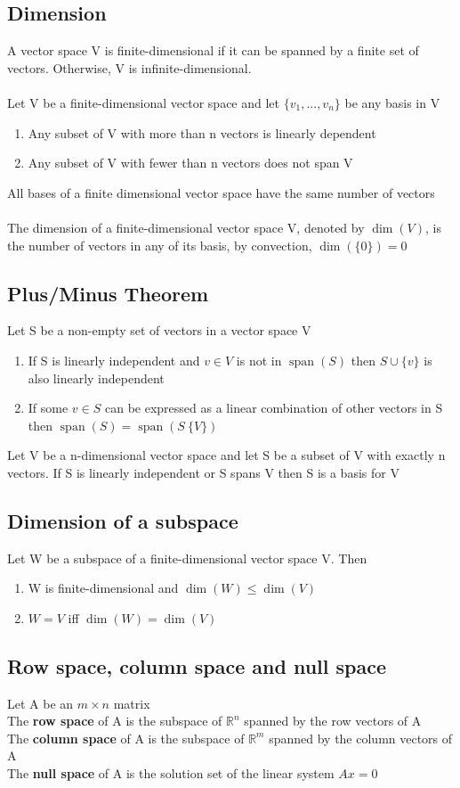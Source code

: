 \documentclass{article}[18pt]
\begin{document}
\subsection{Dimension}
A vector space V is finite-dimensional if it can be spanned by a finite set of vectors. Otherwise, V is infinite-dimensional.\\
\\
Let V be a finite-dimensional vector space and let $\{v_1,...,v_n\}$ be any basis in V
\begin{enumerate}
	\item Any subset of V with more than n vectors is linearly dependent
	\item Any subset of V with fewer than n vectors does not span V
\end{enumerate}
All bases of a finite dimensional vector space have the same number of vectors\\
\\
The dimension of a finite-dimensional vector space V, denoted by $\dim(V)$, is the number of vectors in any of its basis, by convection, $\dim(\{0\})=0$
\subsection{Plus/Minus Theorem}
Let S be a non-empty set of vectors in a vector space V
\begin{enumerate}
	\item If S is linearly independent and $v\in V$ is not in $\operatorname{span}(S)$ then $S\cup \{v\}$ is also linearly independent
	\item If some $v\in S$ can be expressed as a linear combination of other vectors in S then $\operatorname{span}(S)=\operatorname{span}(S\ \{V\})$
\end{enumerate}
Let V be a n-dimensional vector space and let S be a subset of V with exactly n vectors. If S is linearly independent or S spans V then S is a basis for V
\subsection{Dimension of a subspace}
Let W be a subspace of a finite-dimensional vector space V. Then
\begin{enumerate}
	\item W is finite-dimensional and $\dim(W)\leqslant\dim(V)$
	\item $W=V$ iff $\dim(W)=\dim(V)$
\end{enumerate}
\subsection{Row space, column space and null space}
Let A be an $m\times n$ matrix\\
The \textbf{row space} of A is the subspace of $\mathbb{R}^n$ spanned by the row vectors of A\\
The \textbf{column space} of A is the subspace of $\mathbb{R}^m$ spanned by the column vectors of A\\
The \textbf{null space} of A is the solution set of the linear system $Ax=0$
\end{document}
